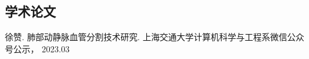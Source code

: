 
\begin{achievements}

\subsection*{学术论文}

\begin{bibliolist}{00}
	\item 徐赞. 肺部动静脉血管分割技术研究.  上海交通大学计算机科学与工程系微信公众号公示， 2023.03
\end{bibliolist}

\begin{bibliolist*}{00}
\end{bibliolist*}



\end{achievements}
